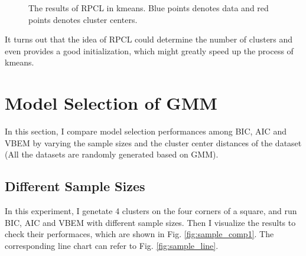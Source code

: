 \documentclass[12pt,a4paper]{article}
\theoremstyle{definition}
\begin{document}
\begin{figure}[htbp]
	\centering
	\caption{The results of RPCL in kmeans. Blue points denotes data and red points denotes cluster centers.}
	\label{fig:RPCL}
\end{figure}

It turns out that the idea of RPCL could determine the number of clusters and even provides a good initialization, which might greatly speed up the process of kmeans.

\section{Model Selection of GMM}

In this section, I compare model selection performances among BIC, AIC and VBEM by varying the sample sizes and the cluster center distances of the dataset (All the datasets are randomly generated based on GMM).

\subsection{Different Sample Sizes}
\label{sec:1}
In this experiment, I genetate 4 clusters on the four corners of a square, and run BIC, AIC and VBEM with different sample sizes. Then I visualize the results to check their performaces, which are shown in Fig. \ref{fig:sample_comp1}. The corresponding line chart can refer to Fig. \ref{fig:sample_line}.
\end{document}
